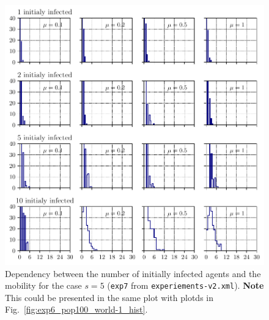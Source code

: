 \documentclass[11pt,a4paper]{article}
\begin{document}
\begin{figure}[ht!]
\includegraphics{plots/plot_exp7_pop100_world-1_hist.pdf}
\caption{Dependency between the number of initially infected agents and the mobility for the case $s=5$ (\texttt{exp7} from  \texttt{experiements-v2.xml}). \textbf{Note} This could be presented in the same plot with plotds in Fig.~\ref{fig:exp6_pop100_world-1_hist}.}
\label{fig:exp7_pop100_world-1_hist}
\end{figure}


\newpage

\appendix
\end{document}
